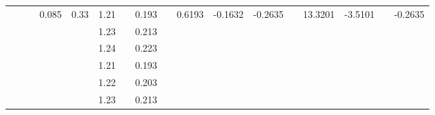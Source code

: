 \documentclass[a4paper,12pt]{article}
\begin{document}
\begin{landscape}
\begin{table}[]
\begin{tabular}{|c|c|c|c|c|c|c|c|c|c|c|c|c|c|c|c|c|}
                     &                           &                         & \multirow{10}{*}{0.085} & \multirow{10}{*}{0.33} & 1.21 &                         & 0.193   &                          & \multirow{10}{*}{0.6193} & \multirow{10}{*}{-0.1632} & \multirow{10}{*}{-0.2635} &                        & \multirow{10}{*}{13.3201} & \multirow{10}{*}{-3.5101} &                            & \multirow{10}{*}{-0.2635} \\ \cline{6-6} \cline{8-8}
                     &                           &                         &                         &                        & 1.23 &                         & 0.213   &                          &                          &                           &                           &                        &                           &                           &                            &                           \\ \cline{6-6} \cline{8-8}
                     &                           &                         &                         &                        & 1.24 &                         & 0.223   &                          &                          &                           &                           &                        &                           &                           &                            &                           \\ \cline{6-6} \cline{8-8}
                     &                           &                         &                         &                        & 1.21 &                         & 0.193   &                          &                          &                           &                           &                        &                           &                           &                            &                           \\ \cline{6-6} \cline{8-8}
                     &                           &                         &                         &                        & 1.22 &                         & 0.203   &                          &                          &                           &                           &                        &                           &                           &                            &                           \\ \cline{6-6} \cline{8-8}
                     &                           &                         &                         &                        & 1.23 &                         & 0.213   &                          &                          &                           &                           &                        &                           &                           &                            &                           \\ \cline{6-6} \cline{8-8}

\end{tabular}
\end{table}
\end{landscape}
\end{document}
